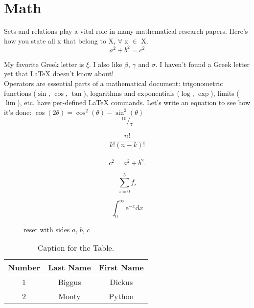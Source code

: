 \documentclass[16pt]{article}
\begin{document}
\section{Math}

Sets and relations play a vital role in many mathematical research papers.
Here's how you state all x that belong to X, $\forall$ x $\in$ X. \\

\[a^2 + b^2 = c^2 \]

My favorite Greek letter is $\xi$. I also like $\beta$, $\gamma$ and $\sigma$.
I haven't found a Greek letter yet that \LaTeX \hspace{1pt} doesn't know
about! \\


Operators are essential parts of a mathematical document:
trigonometric functions ($\sin$, $\cos$, $\tan$),
logarithms and exponentials ($\log$, $\exp$),
limits ($\lim$), etc.
have per-defined LaTeX commands.
Let's write an equation to see how it's done:
$\cos(2\theta) = \cos^{2}(\theta) - \sin^{2}(\theta)$ \\

$$ ^{10}/_{7} $$

$$ \frac{n!}{k!(n - k)!} $$ \\


\begin{equation} %
  c^2 = a^2 + b^2.
  \label{eq:pythagoras} %
\end{equation} %

\begin{equation}
  \sum_{i=0}^{5} f_{i}
\end{equation}

\begin{equation}
  \int_{0}^{\infty} \mathrm{e}^{-x} \mathrm{d}x
\end{equation}

\begin{figure}[H] %
    \centering %
    \caption{reset with sides $a$, $b$, $c$}
    \label{fig:reset}
\end{figure}


\begin{table}[H]
  \caption{Caption for the Table.}
  \begin{tabular}{c|cc}
    Number &  Last Name & First Name \\ %
    \hline %
    1 & Biggus & Dickus \\
    2 & Monty & Python
  \end{tabular}
\end{table}
\end{document}
